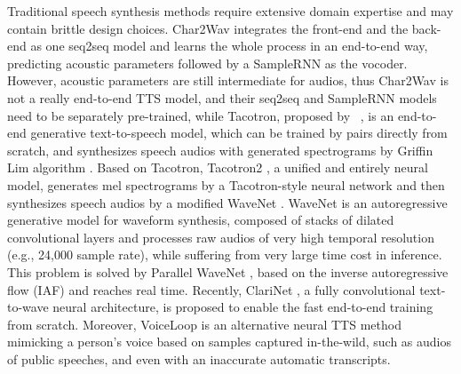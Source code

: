 \documentclass[letterpaper]{article} \usepackage{aaai19}  \usepackage{times}  \usepackage{helvet}  \usepackage{courier}  \usepackage{url}  \usepackage{graphicx}  \frenchspacing
\newcommand{\citet}[1]
{\citeauthor{#1}~\shortcite{#1}}
\begin{document}
Traditional speech synthesis methods require extensive domain expertise and may contain brittle design choices. Char2Wav \cite{sotelo2017char2wav} integrates the front-end and the back-end as one seq2seq \cite{sutskever2014sequence,bahdanau2014neural} model and learns the whole process in an end-to-end way, predicting acoustic parameters followed by a SampleRNN \cite{mehri2016samplernn} as the vocoder. However, acoustic parameters are still intermediate for audios, thus Char2Wav is not a really end-to-end TTS model, and  their seq2seq and SampleRNN models need to be separately pre-trained,
while Tacotron, proposed by \citet{wang2017tacotron}, is an end-to-end generative text-to-speech model, which can be trained by   pairs directly from scratch, and synthesizes speech audios with generated spectrograms by Griffin Lim algorithm \cite{griffin1984signal}.
Based on Tacotron, Tacotron2 \cite{shen2017natural}, a unified and entirely neural model, generates mel spectrograms by a Tacotron-style neural network and then synthesizes speech audios by a modified WaveNet \cite{van2016wavenet}. WaveNet is an autoregressive generative model for waveform synthesis, composed of stacks of dilated convolutional layers and processes raw audios of very high temporal resolution (e.g., 24,000 sample rate), while suffering from very large time cost in inference. This problem is solved by Parallel WaveNet \cite{oord2017parallel}, based on the inverse autoregressive flow (IAF) \cite{kingma2016improved} and reaches  real time. Recently, ClariNet \cite{ping2018clarinet}, a fully convolutional text-to-wave neural architecture, is proposed to enable the fast end-to-end training from scratch.
Moreover, VoiceLoop \cite{taigman2018voiceloop} is an alternative neural TTS method mimicking a person's voice based on samples captured in-the-wild, such as audios of public speeches, and even with an inaccurate automatic transcripts.
\end{document}
